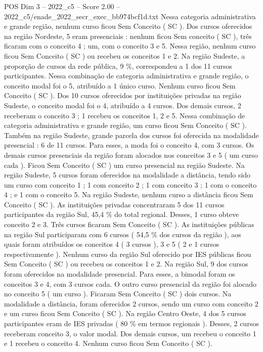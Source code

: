 \begin{textsample}{POS Dim 3 – 2022\_c5 – Score 2.00 – 2022\_c5/enade\_2022\_secr\_exec\_bb974bcf1d.txt}
Nessa categoria administrativa e grande região, nenhum curso ficou Sem Conceito ( SC ).
Dos cursos oferecidos na região Nordeste, 5 eram presenciais : nenhum ficou Sem conceito ( SC ), três ficaram com o conceito 4 ; um, com o conceito 3 e 5.
Nessa região, nenhum curso ficou Sem Conceito ( SC ) ou recebeu os conceitos 1 e 2.
Na região Sudeste, a proporção de cursos da rede pública, 9 \%, correspondeu a 1 dos 11 cursos participantes.
Nessa combinação de categoria administrativa e grande região, o conceito modal foi o 5, atribuído a 1 único curso.
Nenhum curso ficou Sem Conceito ( SC ).
Dos 10 cursos oferecidos por instituições privadas na região Sudeste, o conceito modal foi o 4, atribuído a 4 cursos.
Dos demais cursos, 2 receberam o conceito 3 ; 1 recebeu os conceitos 1, 2 e 5.
Nessa combinação de categoria administrativa e grande região, um curso ficou Sem Conceito ( SC ).
Também na região Sudeste, grande parcela dos cursos foi oferecida na modalidade presencial : 6 de 11 cursos.
Para esses, a moda foi o conceito 4, com 3 cursos.
Os demais cursos presenciais da região foram alocados nos conceitos 3 e 5 ( um curso cada ).
Ficou Sem Conceito ( SC ) um curso presencial na região Sudeste.
Na região Sudeste, 5 cursos foram oferecidos na modalidade a distância, tendo sido um curso com conceito 1 ; 1 com conceito 2 ; 1 com conceito 3 ; 1 com o conceito 4 ; e 1 com o conceito 5.
Na região Sudeste, nenhum curso a distância ficou Sem Conceito ( SC ).
As instituições privadas concentraram 5 dos 11 cursos participantes da região Sul, 45,4 \% do total regional.
Desses, 1 curso obteve conceito 2 e 3.
Três cursos ficaram Sem Conceito ( SC ).
As instituições públicas na região Sul participaram com 6 cursos ( 54,5 \% dos cursos da região ), aos quais foram atribuídos os conceitos 4 ( 3 cursos ), 3 e 5 ( 2 e 1 cursos respectivamente ).
Nenhum curso da região Sul oferecido por IES públicas ficou Sem Conceito ( SC ) ou recebeu os conceitos 1 e 2.
Na região Sul, 9 dos cursos foram oferecidos na modalidade presencial.
Para esses, a bimodal foram os conceitos 3 e 4, com 3 cursos cada.
O outro curso presencial da região foi alocado no conceito 5 ( um curso ).
Ficaram Sem Conceito ( SC ) dois cursos.
Na modalidade a distância, foram oferecidos 2 cursos, sendo um curso com conceito 2 e um curso ficou Sem Conceito ( SC ).
Na região Centro Oeste, 4 dos 5 cursos participantes eram de IES privadas ( 80 \% em termos regionais ).
Desses, 2 cursos receberam conceito 3, o valor modal.
Dos demais cursos, um recebeu o conceito 1 e 1 recebeu o conceito 4.
Nenhum curso ficou Sem Conceito ( SC ).

\end{textsample}
